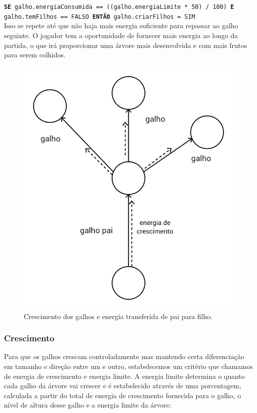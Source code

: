 \documentclass[12pt]{article}
\begin{document}
 \texttt{\footnotesize{\textbf{SE} galho.energiaConsumida == ((galho.energiaLimite * 50) / 100) \textbf{E} galho.temFilhos == FALSO 
        \textbf{ENT\~AO} galho.criarFilhos = SIM}} \\


Isso se repete at\'e que n\~ao haja mais energia suficiente
para repassar ao galho seguinte. O jogador tem a oportunidade de fornecer mais energia ao longo da partida, o que
ir\'a proporcionar uma \'arvore mais desenvolvida e com mais frutos para serem colhidos.

	\begin{figure}[ht!]
	\begin{center}
		\includegraphics[scale=0.2]{img/PI3_Ponto_Crescimento.png}
		\caption{\footnotesize {Crescimento dos galhos e energia transferida de pai para filho.} }
	\end{center}
	\end{figure}	
	
\subsubsection{Crescimento}
Para que os galhos crescam controladamente mas mantendo certa diferencia\c c\~ao em tamanho e
dire\c c\~ao entre um e outro, estabelecemos um crit\'erio que chamamos de energia de crescimento e energia limite.
A energia limite determina o quanto cada  galho da \'arvore vai crescer e \'e estabelecido atrav\'es de uma porcentagem,
calculada a partir do total de energia de crescimento fornecida para o galho, o n\'ivel de altura desse galho e a energia
limite da \'arvore:
\end{document}
